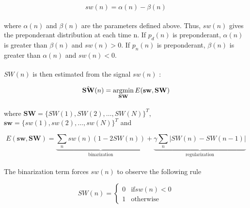\documentclass[a4paper,12pt]{article}
\begin{document}
\begin{equation}
sw(n) = \alpha(n) - \beta(n)
\end{equation}

\paragraph{}
where $\alpha(n)$ and $\beta(n)$ are the parameters defined above. Thus, $sw(n)$ gives the preponderant distribution at each time n. If $p_d(n)$ is preponderant, $\alpha(n)$ is greater than $\beta(n)$ and $sw(n) > 0$. If $p_n(n)$ is preponderant, $\beta(n)$ is greater than $\alpha(n)$ and $sw(n) < 0$.

\paragraph{}
$SW(n)$ is then estimated from the signal $sw(n)$ :

\begin{equation}
\hat{\mathbf{SW}}(n) = \operatornamewithlimits{argmin}\limits_{\mathbf{SW}} E(\mathbf{sw}, \mathbf{SW})
\end{equation}

\paragraph{}
where $\mathbf{SW} = \{SW(1), SW(2), \ldots, SW(N) \}^T$, $\mathbf{sw} = \{sw(1), sw(2), \ldots, sw(N) \}^T$ and

\begin{equation}
E(\mathbf{sw}, \mathbf{SW}) = \underbrace{\sum_n sw(n) (1 - 2SW(n))}_{\mbox{binarization}} + \underbrace{\gamma \sum_n |SW(n) - SW(n-1)|}_{\mbox{regularization}}
\end{equation}

\paragraph{}
The binarization term forces $sw(n)$ to observe the following rule

\begin{equation}
SW(n) = \left\{
    \begin{array}{ll}
        0 & \mbox{if} sw(n) < 0 \\
        1 & \mbox{otherwise}
    \end{array}
\right.
\end{equation}
\end{document}
